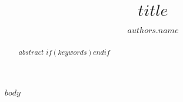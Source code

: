\documentclass[$for(classoption)$$classoption$$sep$,$endfor$]{wiley-article}
\title{$title$}
\author[$if(authors.affil)$$authors.index$$else$1$endif$$if(authors.presentadd)$\authfn{1}$endif$$if(authors.contrib)$\authfn{2}$endif$]{$authors.name$}
\begin{document}
\maketitle

\begin{abstract}
$abstract$
$if(keywords)$$endif$
\end{abstract}

$body$

\printendnotes




\end{document}
